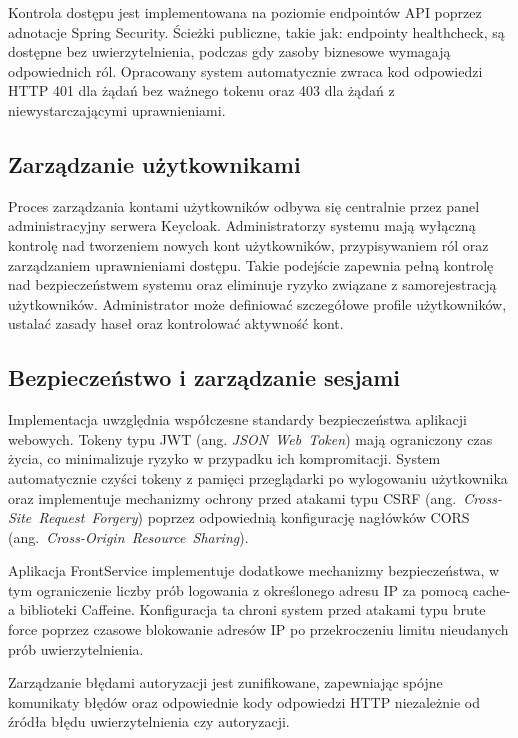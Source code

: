 Kontrola dostępu jest implementowana na poziomie endpointów API poprzez adnotacje Spring Security. Ścieżki publiczne, takie jak: endpointy healthcheck, są dostępne bez uwierzytelnienia, podczas gdy zasoby biznesowe wymagają odpowiednich ról. Opracowany system automatycznie zwraca kod odpowiedzi HTTP 401 dla żądań bez ważnego tokenu oraz 403 dla żądań z niewystarczającymi uprawnieniami.

\subsection{Zarządzanie użytkownikami}

Proces zarządzania kontami użytkowników odbywa się centralnie przez panel administracyjny serwera Keycloak. Administratorzy systemu mają wyłączną kontrolę nad tworzeniem nowych kont użytkowników, przypisywaniem ról oraz zarządzaniem uprawnieniami dostępu. Takie podejście zapewnia pełną kontrolę nad bezpieczeństwem systemu oraz eliminuje ryzyko związane z samorejestracją użytkowników. Administrator może definiować szczegółowe profile użytkowników, ustalać zasady haseł oraz kontrolować aktywność kont. 

\subsection{Bezpieczeństwo i zarządzanie sesjami}

Implementacja uwzględnia współczesne standardy bezpieczeństwa aplikacji webowych. Tokeny typu JWT (ang. \textit{\mbox{JSON Web Token}}) mają ograniczony czas życia, co minimalizuje ryzyko w przypadku ich kompromitacji. System automatycznie czyści tokeny z pamięci przeglądarki po wylogowaniu użytkownika oraz implementuje mechanizmy ochrony przed atakami typu CSRF (ang.~\textit{\mbox{Cross-Site Request Forgery}}) poprzez odpowiednią konfigurację nagłówków CORS \\ (ang.~\textit{\mbox{Cross-Origin Resource Sharing}}).

Aplikacja FrontService implementuje dodatkowe mechanizmy bezpieczeństwa, w tym ograniczenie liczby prób logowania z określonego adresu IP za pomocą cache-a biblioteki Caffeine. Konfiguracja ta chroni system przed atakami typu brute force poprzez czasowe blokowanie adresów IP po przekroczeniu limitu nieudanych prób uwierzytelnienia.

Zarządzanie błędami autoryzacji jest zunifikowane, zapewniając spójne komunikaty błędów oraz odpowiednie kody odpowiedzi HTTP niezależnie od źródła błędu uwierzytelnienia czy autoryzacji.